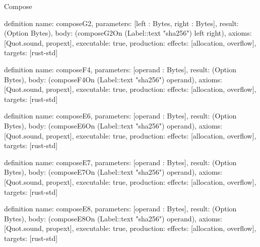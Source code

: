 \begin{lexlean}{Compose}
\begin{semanticmodule}
definition{
  name: composeG2,
  parameters: [left : Bytes, right : Bytes],
  result: (Option Bytes),
  body: (composeG2On (Label::text "sha256") left right),
  axioms: [Quot.sound, propext],
  executable: true,
  production: {effects: [allocation, overflow], targets: [rust-std]}
}

definition{
  name: composeF4,
  parameters: [operand : Bytes],
  result: (Option Bytes),
  body: (composeF4On (Label::text "sha256") operand),
  axioms: [Quot.sound, propext],
  executable: true,
  production: {effects: [allocation, overflow], targets: [rust-std]}
}

definition{
  name: composeE6,
  parameters: [operand : Bytes],
  result: (Option Bytes),
  body: (composeE6On (Label::text "sha256") operand),
  axioms: [Quot.sound, propext],
  executable: true,
  production: {effects: [allocation, overflow], targets: [rust-std]}
}

definition{
  name: composeE7,
  parameters: [operand : Bytes],
  result: (Option Bytes),
  body: (composeE7On (Label::text "sha256") operand),
  axioms: [Quot.sound, propext],
  executable: true,
  production: {effects: [allocation, overflow], targets: [rust-std]}
}

definition{
  name: composeE8,
  parameters: [operand : Bytes],
  result: (Option Bytes),
  body: (composeE8On (Label::text "sha256") operand),
  axioms: [Quot.sound, propext],
  executable: true,
  production: {effects: [allocation, overflow], targets: [rust-std]}
}
\end{semanticmodule}
\end{lexlean}
